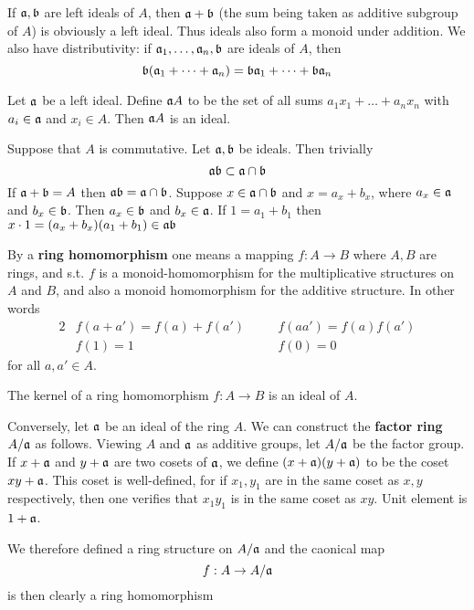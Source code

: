 \documentclass[11pt]{article}
\begin{document}
If \(\mathfrak{a},\mathfrak{b}\) are left ideals of \(A\), then \(\mathfrak{a}+\mathfrak{b}\) (the sum being taken as additive subgroup
of \(A\)) is obviously a left ideal. Thus ideals also form a monoid under addition. We also have
distributivity: if \(\mathfrak{a}_1,\dots,\mathfrak{a}_n,\mathfrak{b}\) are ideals of \(A\), then
\begin{equation*}
\mathfrak{b}(\mathfrak{a}_1+\dots+\mathfrak{a}_n)=\mathfrak{b}\mathfrak{a}_1+\dots+\mathfrak{b}\mathfrak{a}_n
\end{equation*}

Let \(\mathfrak{a}\) be a left ideal. Define \(\mathfrak{a} A\) to be the set of all sums \(a_1x_1+\dots+a_nx_n\)
with \(a_i\in\mathfrak{a}\) and \(x_i\in A\). Then \(\mathfrak{a} A\) is an ideal.

Suppose that \(A\) is commutative. Let \(\mathfrak{a},\mathfrak{b}\) be ideals. Then trivially
\begin{equation*}
\mathfrak{a}\mathfrak{b}\subset\mathfrak{a}\cap\mathfrak{b}
\end{equation*}
If \(\mathfrak{a}+\mathfrak{b}=A\) then \(\mathfrak{a}\mathfrak{b}=\mathfrak{a}\cap \mathfrak{b}\).  Suppose \(x\in\mathfrak{a}\cap\mathfrak{b}\) and \(x=a_x+b_x\), where \(a_x\in\mathfrak{a}\) and \(b_x\in\mathfrak{b}\).
Then \(a_x\in\mathfrak{b}\) and \(b_x\in\mathfrak{a}\). If \(1=a_1+b_1\) then \(x\cdot 1=(a_x+b_x)(a_1+b_1)\in\mathfrak{a}\mathfrak{b}\)

By a \textbf{ring homomorphism} one means a mapping \(f:A\to B\) where \(A,B\) are rings, and s.t. \(f\) is
a monoid-homomorphism for the multiplicative structures on \(A\) and \(B\), and also a monoid
homomorphism for the additive structure. In other words
\begin{alignat*}{2}
&f(a+a')=f(a)+f(a')\quad&&f(aa')=f(a)f(a')\\
&f(1)=1&&f(0)=0
\end{alignat*}
for all \(a,a'\in A\).

The kernel of a ring homomorphism \(f:A\to B\) is an ideal of \(A\).

Conversely, let \(\mathfrak{a}\) be an ideal of the ring \(A\). We can construct the \textbf{factor ring} \(A/\mathfrak{a}\) as
follows. Viewing \(A\) and \(\mathfrak{a}\) as additive groups, let \(A/\mathfrak{a}\) be the factor group. If \(x+\mathfrak{a}\)
and \(y+\mathfrak{a}\) are two cosets of \(\mathfrak{a}\), we define \((x+\mathfrak{a})(y+\mathfrak{a})\) to be the coset \(xy+\mathfrak{a}\). This
coset is well-defined, for if \(x_1,y_1\) are in the same coset as \(x,y\) respectively, then one
verifies that \(x_1y_1\) is in the same coset as \(xy\). Unit element is \(1+\mathfrak{a}\).

We therefore defined a ring structure on \(A/\mathfrak{a}\) and the caonical map
\begin{equation*}
f:A\to A/\mathfrak{a}
\end{equation*}
is then clearly a ring homomorphism
\end{document}
